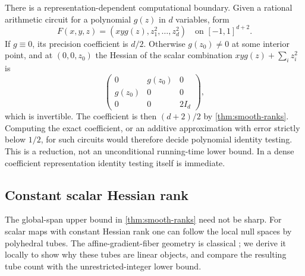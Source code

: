 There is a representation-dependent computational boundary. Given a
rational arithmetic circuit for a polynomial $g(z)$ in $d$ variables,
form
\[
 F(x,y,z)=(xyg(z),z_1^2,\ldots,z_d^2)
 \quad\text{on }[-1,1]^{d+2}.
\]
If $g\equiv0$, its precision coefficient is $d/2$. Otherwise
$g(z_0)\ne0$ at some interior point, and at $(0,0,z_0)$ the Hessian of
the scalar combination $xyg(z)+\sum_i z_i^2$ is
\[
 \begin{pmatrix}0&g(z_0)&0\\g(z_0)&0&0\\0&0&2I_d\end{pmatrix},
\]
which is invertible. The coefficient is then $(d+2)/2$ by
\cref{thm:smooth-ranks}. Computing the exact coefficient, or an additive
approximation with error strictly below $1/2$, for such circuits would
therefore decide polynomial identity testing. This is a reduction, not
an unconditional running-time lower bound. In a dense coefficient
representation identity testing itself is immediate.

\subsection{Constant scalar Hessian rank}

The global-span upper bound in \cref{thm:smooth-ranks} need not be sharp.
For scalar maps with constant Hessian rank one can follow the local
null spaces by polyhedral tubes. The affine-gradient-fiber geometry is
classical \citep[Definition 1.1 and the following paragraph, pp.~208--209]{nicola2008};
we derive it locally to show why these tubes are linear objects, and
compare the resulting tube count with the unrestricted-integer lower
bound.

